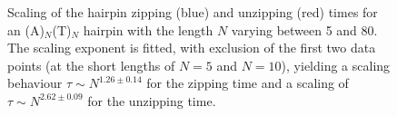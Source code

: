 \begin{figure}[htb]
       \begin{center}
               \scalebox{0.9}{
                        \nonstopmode
                        
                        \errorstopmode
                        \rule[-0.5cm]{0cm}{0cm}}
                \caption{Scaling of the hairpin zipping (blue) and unzipping (red) times for an (A)$_N$(T)$_N$ hairpin with the length $N$ varying between 5 and 80. The scaling exponent is fitted, with exclusion of the first two data points (at the short lengths of $N = 5$ and $N = 10$), yielding a scaling behaviour $\tau \sim N^{1.26 \pm 0.14}$ for the zipping time and a scaling of $\tau \sim N^{2.62 \pm 0.09}$ for the unzipping time.}
                \label{hairpinScaling}
        \end{center}
\end{figure}

